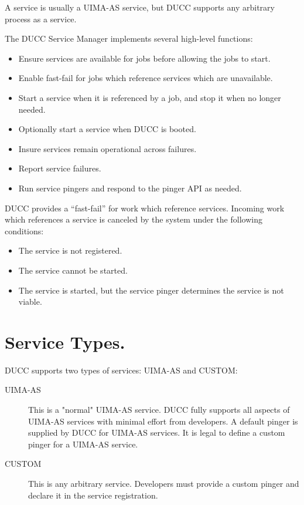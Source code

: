       A service is usually a UIMA-AS service, but DUCC supports any arbitrary process as a service.

      The DUCC Service Manager implements several high-level functions:
      
      \begin{itemize}
          \item Ensure services are available for jobs before allowing the jobs to start.
          \item Enable fast-fail for jobs which reference services which are unavailable.
          \item Start a service when it is referenced by a job, and stop it when no longer needed.
          \item Optionally start a service when DUCC is booted.
          \item Insure services remain operational across failures.
          \item Report service failures.
          \item Run service pingers and respond to the pinger API as needed.
       \end{itemize}

       DUCC provides a ``fast-fail'' for work which reference services.  Incoming work which
       references a service is canceled by the system under the following conditions:
       \begin{itemize}
         \item The service is not registered.
         \item The service cannot be started.
         \item The service is started, but the service pinger determines the service is not
           viable.
       \end{itemize}
         
    \section{Service Types.}
    \label{sec:services.types}
      DUCC supports two types of services: UIMA-AS and CUSTOM:
      
      \begin{description}
          \item[UIMA-AS] This is a "normal" UIMA-AS service. DUCC fully supports all aspects of UIMA-AS
            services with minimal effort from developers.  A default pinger is supplied by DUCC
            for UIMA-AS services.  It is legal to define a custom pinger for a UIMA-AS service.
            
          \item[CUSTOM] This is any arbitrary service.  Developers must provide a custom pinger
            and declare it in the service registration.            
      \end{description}

